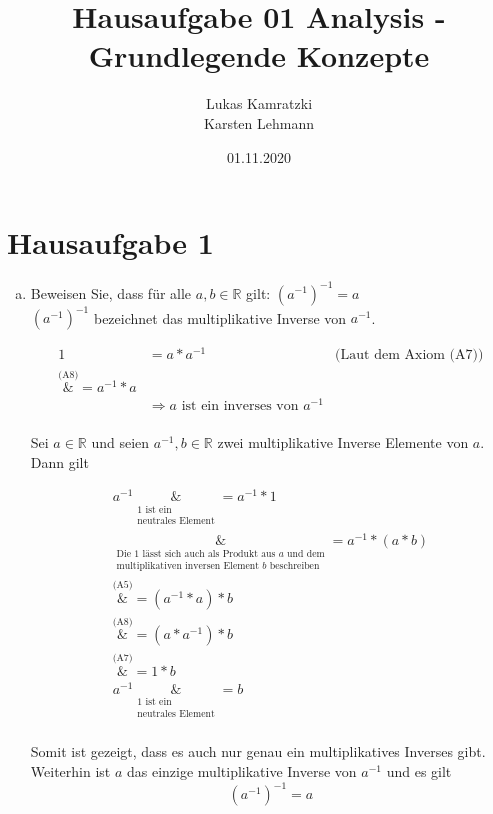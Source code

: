 \documentclass{article}
\author{Lukas Kamratzki \\ Karsten Lehmann}
\date{01.11.2020}
\title{Hausaufgabe 01 Analysis - Grundlegende Konzepte}
\begin{document}
\maketitle
\newpage

\section*{Hausaufgabe 1}

\begin{enumerate}[(a)]
\item Beweisen Sie, dass für alle $a, b \in \mathbb{R}$ gilt: $(a^{-1})^{-1} = a$ \\

  $(a^{-1})^{-1}$ bezeichnet das multiplikative Inverse von $a^{-1}$.

  \begin{align*}
    1  &= a * a^{-1}  &\text{(Laut dem Axiom (A7))}\\
       \overset{\text{(A8)}}&{=} a^{-1} * a  \\
       &\Rightarrow a \text{ ist ein inverses von } a^{-1}
  \end{align*}
  \\
  Sei $a \in \mathbb{R}$ und seien $a^{-1}, b \in \mathbb{R}$ zwei multiplikative Inverse Elemente von $a$.
  Dann gilt

  \begin{align*}
    a^{-1} \underset{\substack{1 \text{ ist ein} \\ \text{neutrales Element}}}&{=} a^{-1} * 1 \\
           \underset{\substack{\text{Die } 1 \text{ lässt sich auch als Produkt aus } a \text{ und dem}\\ \text{multiplikativen inversen Element } b \text{ beschreiben}}}&{=} a^{-1} * (a * b) \\
           \overset{\text{(A5)}}&{=} (a^{-1} * a) * b \\
           \overset{\text{(A8)}}&{=} (a * a^{-1}) * b \\
           \overset{\text{(A7)}}&{=} 1 * b \\
    a^{-1} \underset{\substack{1 \text{ ist ein} \\ \text{neutrales Element}}}&{=} b \\
  \end{align*}

  Somit ist gezeigt, dass es auch nur genau ein multiplikatives Inverses gibt. Weiterhin ist $a$ das einzige multiplikative Inverse von $a^{-1}$ und es gilt
  \[
    (a^{-1})^{-1} = a
  \]


\end{enumerate}
\end{document}
